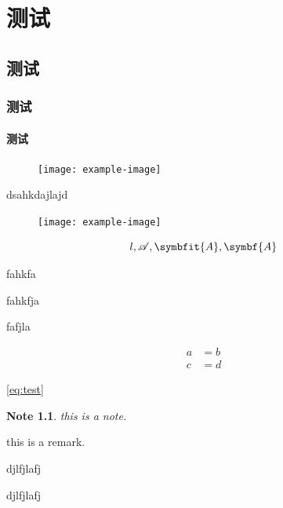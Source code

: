 \documentclass[
	leqno, %
	a4paper, %
	fontsize=12pt, %
	twoside=false, %
	open=any, %
	chapterentrydots=true, %
	numbers=noenddot, %
    UTF-8, %
	toc=nottotoc,
	BCOR=12mm,
	DIV=calc,
]{styles/kaobook}
\let\boldsymbol\symbfit
\let\mathbf\symbf
\renewenvironment{proof}{\begin{prf}}{\end{prf}}
\newenvironment{solution}{\begin{soln}}{\end{soln}}
\renewenvironment{remark}{\begin{rmk}}{\end{rmk}}
\newtheorem{note}{Note}[chapter]
\begin{document}
\chapter{测试}	
\section{测试}
\subsection{测试}
\subsubsection{测试}


\begin{figure}[H]
    \centering
    \texttt{[image: example-image]}
\end{figure}
dsahkdajlajd
\begin{figure}[H]
    \centering
    \texttt{[image: example-image]}
\end{figure}
\[
	l, \mathscr{A}, \boldsymbol{A}, \mathbf{A}
\]

\begin{solution}
	fahkfa
	
	fahkfja


	fafjla
\end{solution}

\begin{equation}\label{eq:test}
	\begin{aligned}
		a &= b \\
		c &= d
	\end{aligned}
\end{equation}

\marginnote{\blindtext}

\cref{eq:test}
\begin{note}
	this is a note.
\end{note}

\begin{remark}
	this is a remark.
\end{remark}	

\begin{proof}[fjjjjjj]
	 djlfjlafj
\end{proof}

\begin{solution}[fjjjjjj]
	 djlfjlafj
\end{solution}
\end{document}
